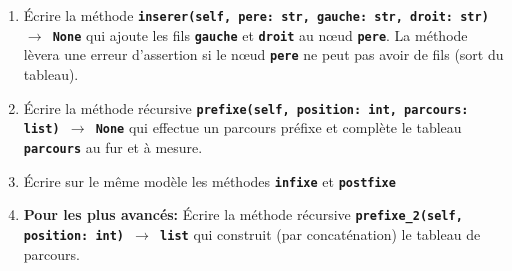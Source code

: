 \documentclass[a4paper,11pt]{article}
\begin{document}
\begin{exo}
\begin{enumerate}
        \item Écrire la méthode \textbf{\texttt{inserer(self, pere: str, gauche: str, droit: str) $\rightarrow$ None}} qui ajoute les fils \textbf{\texttt{gauche}} et \textbf{\texttt{droit}} au nœud \textbf{\texttt{pere}}.  La méthode lèvera une erreur d’assertion si le nœud \texttt{\textbf{pere}} ne peut pas avoir de fils (sort du tableau).
        \item Écrire la méthode récursive \textbf{\texttt{prefixe(self, position: int, parcours: list) $\rightarrow$ None}} qui effectue un parcours préfixe et complète le tableau \textbf{\texttt{parcours}} au fur et à mesure.
        \item Écrire sur le même modèle les méthodes \textbf{\texttt{infixe}} et \textbf{\texttt{postfixe}}
        \item \textbf{Pour les plus avancés:} Écrire la méthode récursive \textbf{\texttt{prefixe\_2(self, position: int) $\rightarrow$ list}} qui construit (par concaténation) le tableau de parcours.
    \end{enumerate}
\end{exo}
\end{document}
